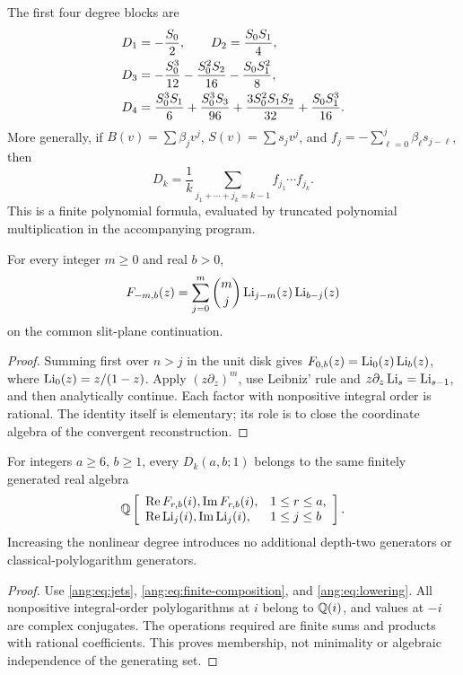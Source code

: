 The first four degree blocks are
\begin{align}
 D_1&=-\frac{S_0}{2},\qquad
 D_2=\frac{S_0S_1}{4},\notag\\
 D_3&=-\frac{S_0^3}{12}-\frac{S_0^2S_2}{16}
                         -\frac{S_0S_1^2}{8},\notag\\
 D_4&=\frac{S_0^3S_1}{6}+\frac{S_0^3S_3}{96}
       +\frac{3S_0^2S_1S_2}{32}+\frac{S_0S_1^3}{16}.
 \label{ang:eq:first-D}
\end{align}
More generally, if $B(v)=\sum\beta_jv^j$,
$S(v)=\sum s_jv^j$, and $f_j=-\sum_{\ell=0}^j\beta_\ell
s_{j-\ell}$, then
\begin{equation}
 D_k=\frac1k\sum_{j_1+\cdots+j_k=k-1}
                 f_{j_1}\cdots f_{j_k}.
 \label{ang:eq:finite-composition}
\end{equation}
This is a finite polynomial formula, evaluated by truncated polynomial
multiplication in the accompanying program.

\begin{proposition}
\label{ang:prop:lowering}
For every integer $m\ge0$ and real $b>0$,
\begin{equation}
 F_{-m,b}(z)=\sum_{j=0}^m\binom mj
             \operatorname{Li}_{j-m}(z)\operatorname{Li}_{b-j}(z)
 \label{ang:eq:lowering}
\end{equation}
on the common slit-plane continuation.
\end{proposition}
\begin{proof}
Summing first over $n>j$ in the unit disk gives
$F_{0,b}(z)=\operatorname{Li}_0(z)\operatorname{Li}_b(z)$, where
$\operatorname{Li}_0(z)=z/(1-z)$. Apply $(z\partial_z)^m$, use
Leibniz' rule and $z\partial_z\operatorname{Li}_s=\operatorname{Li}_{s-1}$, and
then analytically continue. Each factor with nonpositive integral
order is rational. The identity itself is elementary; its role is
to close the coordinate algebra of the convergent reconstruction.
\end{proof}

\begin{corollary}
\label{ang:cor:algebra}
For integers $a\ge6$, $b\ge1$, every $D_k(a,b;1)$ belongs to
the same finitely generated real algebra
\begin{equation}
 \mathbb Q\left[
 \begin{array}{ll}
 \operatorname{Re}F_{r,b}(i),\operatorname{Im}F_{r,b}(i),&1\le r\le a,\\
 \operatorname{Re}\operatorname{Li}_j(i),\operatorname{Im}\operatorname{Li}_j(i),&1\le j\le b
 \end{array}\right].
 \label{ang:eq:algebra}
\end{equation}
Increasing the nonlinear degree introduces no additional depth-two
generators or classical-polylogarithm generators.
\end{corollary}
\begin{proof}
Use \eqref{ang:eq:jets}, \eqref{ang:eq:finite-composition}, and
\eqref{ang:eq:lowering}. All nonpositive integral-order
polylogarithms at $i$ belong to $\mathbb Q(i)$, and values at $-i$ are
complex conjugates. The operations required are finite sums and
products with rational coefficients. This proves membership, not
minimality or algebraic independence of the generating set.
\end{proof}

